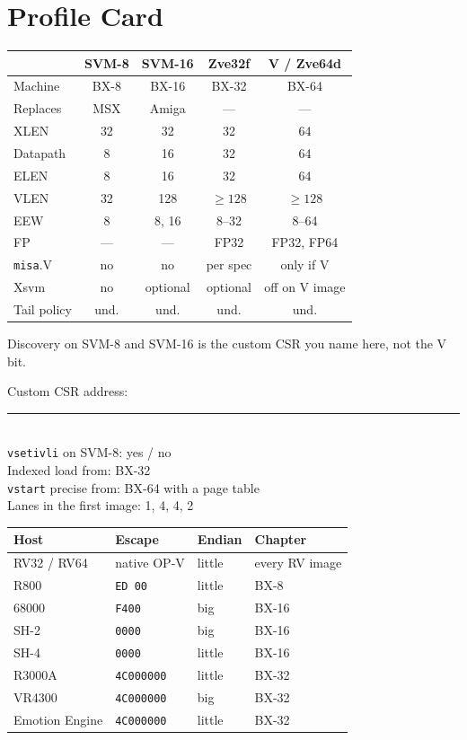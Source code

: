 \chapter{Profile Card}

\begin{center}
\begin{tabular}{@{}lcccc@{}}
\toprule
 & SVM-8 & SVM-16 & Zve32f & V / Zve64d \\
\midrule
Machine & BX-8 & BX-16 & BX-32 & BX-64 \\
Replaces & MSX & Amiga & --- & --- \\
XLEN & 32 & 32 & 32 & 64 \\
Datapath & 8 & 16 & 32 & 64 \\
ELEN & 8 & 16 & 32 & 64 \\
VLEN & 32 & 128 & $\ge 128$ & $\ge 128$ \\
EEW & 8 & 8, 16 & 8--32 & 8--64 \\
FP & --- & --- & FP32 & FP32, FP64 \\
\texttt{misa}.V & no & no & per spec & only if V \\
Xsvm & no & optional & optional & off on V image \\
Tail policy & und. & und. & und. & und. \\
\bottomrule
\end{tabular}
\end{center}

Discovery on SVM-8 and SVM-16 is the custom CSR you name here, not the V bit.

\bigskip
\noindent Custom CSR address: \rule{4cm}{0.4pt}\\
\noindent \texttt{vsetivli} on SVM-8: yes / no\\
\noindent Indexed load from: BX-32\\
\noindent \texttt{vstart} precise from: BX-64 with a page table\\
\noindent Lanes in the first image: 1, 4, 4, 2

\bigskip
\begin{center}
\small
\begin{tabular}{@{}llll@{}}
\toprule
Host & Escape & Endian & Chapter \\
\midrule
RV32 / RV64 & native OP-V & little & every RV image \\
R800 & \texttt{ED 00} & little & BX-8 \\
68000 & \texttt{F400} & big & BX-16 \\
SH-2 & \texttt{0000} & big & BX-16 \\
SH-4 & \texttt{0000} & little & BX-16 \\
R3000A & \texttt{4C000000} & little & BX-32 \\
VR4300 & \texttt{4C000000} & big & BX-32 \\
Emotion Engine & \texttt{4C000000} & little & BX-32 \\
\bottomrule
\end{tabular}
\end{center}

